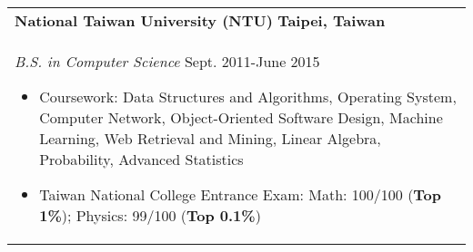 \documentclass[a4paper,10pt]{article} %
\begin{document}
{\begin{tabular}{p{18.5cm}}
{\fontsize{11}{13.2}\textbf{National Taiwan University (NTU)}} \hfill \textbf{Taipei, Taiwan}\\
{\it B.S. in Computer Science} \hfill Sept. 2011-June 2015
\begin{itemize}
\item Coursework: Data Structures and Algorithms, Operating System, Computer Network, Object-Oriented Software Design, Machine Learning, Web Retrieval and Mining, Linear Algebra, Probability, Advanced Statistics 
\item Taiwan National College Entrance Exam:  Math: 100/100 (\textbf{Top 1\%}); Physics: 99/100 (\textbf{Top 0.1\%})\vspace*{-\baselineskip}
\end{itemize} 
\end{tabular}

}
\end{document}
